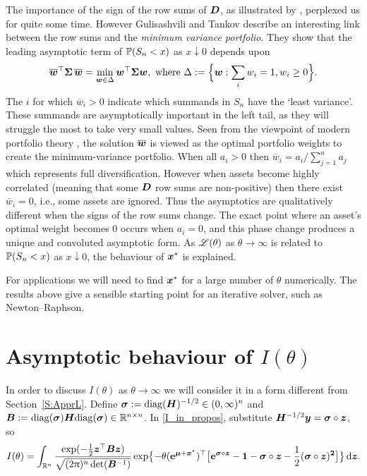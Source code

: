 \begin{remark}\label{Rem:25.8b} \rm The importance of the sign of the row sums of
  $\bm{D}$, as illustrated by , perplexed us for
  quite some time. However Gulisashvili and Tankov \cite{tankov2015tail}
  describe an interesting link between the row sums and the \emph{minimum
    variance portfolio}. They show that the leading asymptotic term of
  $\operatorname{{\mathbb P}}(S_n < x)$ as $x \downarrow 0$ depends upon
\[ \overline{\bm{w}}^\top \bm{\Sigma} \, \overline{\bm{w}}
 = \min_{\bm{w} \in \Delta} \bm{w}^\top \bm{\Sigma}  \bm{w} , \text{ where }
\Delta := \Bigl\{ \bm{w} : \sum_i w_i = 1, w_i \geq 0 \Bigr\} . \]
The $i$ for which $\overline{w}_i > 0$ indicate which summands in $S_n$ have
the `least variance'. These summands are asymptotically important in the left
tail, as they will struggle the most to take very small values. Seen from the
viewpoint of modern portfolio theory \cite{markowitz1952portfolio}, the
solution $\overline{\bm{w}}$ is viewed as the optimal portfolio weights to
create the minimum-variance portfolio. When all $a_i > 0$ then $\overline{w}_i
= a_i / \sum_{j=1}^n a_j$ which represents full diversification. However when
assets become highly correlated (meaning that some $\bm{D}$ row sums are
non-positive) then there exist $\overline{w}_i = 0$, i.e., some assets are
ignored. Thus the asymptotics are qualitatively different when the signs of
the row sums change. The exact point where an asset's optimal weight becomes 0
occurs when $a_i = 0$, and this phase change produces a unique and convoluted
asymptotic form. As $\mathscr{L}(\theta)$ as $\theta \to \infty$ is related to
$\operatorname{{\mathbb P}}(S_n < x)$ as $x \downarrow 0$, the behaviour of $\bm{x}^*$ is
explained. \remQED
\end{remark}

For applications we will need to find $\bm{x}^*$ for a large number of $\theta$
numerically. The results above give a sensible starting point for an iterative
solver, such as Newton--Raphson.

\section{Asymptotic behaviour of $I(\theta)$}\label{S:Asympt}

In order to discuss $I(\theta)$ as $\theta \to \infty$ we will consider it in
a form different from Section~\ref{S:ApprL}. Define $ \bm{\sigma} :=
\mathrm{diag}(\bm{H})^{-1/2} \in (0,\infty)^n$ and $\bm{B} :=
\mathrm{diag}(\bm{\sigma}) \bm{H} \mathrm{diag}(\bm{\sigma}) \in \mathbb{R}^{n \times
  n}$.  In \eqref{I_in_propos}, substitute $\bm{H}^{-1/2} \bm{y} = \bm{\sigma} \circ \bm{z}$, so
\begin{equation} \label{new_I}
	I(\theta) = \int_{\mathbb{R}^n}
 \frac{\exp( {-}\frac12 \bm{z}^\top \bm{B} \bm{z})}{\sqrt{(2\uppi)^n\det(\bm{B}^{-1})}}
	\exp\bigl\{{-}\theta (\text{\bf{e}}^{\bm{\mu} + \bm{x}^*})^\top \bigl[ \text{\bf{e}}^{\bm{\sigma} \circ \bm{z}} - \bm{1} - \bm{\sigma} \circ \bm{z} - \frac12(\bm{\sigma} \circ \bm{z})^{\bm{2}} \bigr] \bigr\}\mathop{}\!\mathrm{d} \bm{z} .
\end{equation}

